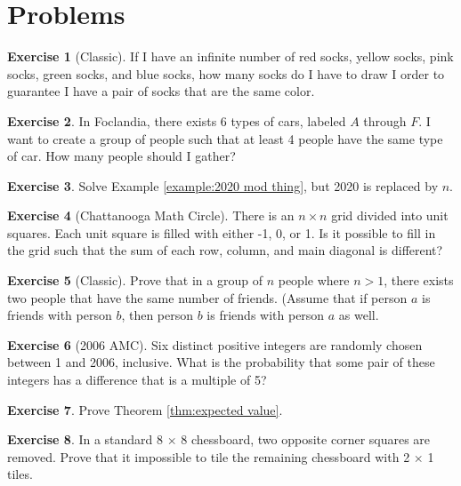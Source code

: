 \documentclass[l1pt]{article}
\theoremstyle{plain}
\theoremstyle{definition}
\newtheorem{exercise}{Exercise}[section]
\theoremstyle{remark}
\begin{document}
\bigskip


\section{Problems}

\begin{exercise}[Classic]
If I have an infinite number of red socks, yellow socks, pink socks, green socks, and blue socks, how many socks do I have to draw I order to guarantee I have a pair of socks that are the same color.
\end{exercise}

\begin{exercise}
In Foclandia, there exists 6 types of cars, labeled $A$ through $F$. I want to create a group of people such that at least 4 people have the same type of car. How many people should I gather?
\end{exercise}

\begin{exercise}
 Solve Example \ref{example:2020 mod thing}, but 2020 is replaced by $n$.
\end{exercise}

\begin{exercise}[Chattanooga Math Circle]
 There is an $n \times n$ grid divided into unit squares. Each unit square is filled with either -1, 0, or 1. Is it possible to fill in the grid such that the sum of each row, column, and main diagonal is different?
\end{exercise}

\begin{exercise}[Classic]
Prove that in a group of $n$ people where $n>1$, there exists two people that have the same number of friends. (Assume that if person $a$ is friends with person $b$, then person $b$ is friends with person $a$ as well. 
\end{exercise}

\begin{exercise}[2006 AMC]
 Six distinct positive integers are randomly chosen between 1 and 2006, inclusive. What is the probability that some pair of these integers has a difference that is a multiple of 5?
\end{exercise}

\begin{exercise}
 Prove Theorem \ref{thm:expected value}.
\end{exercise}

\begin{exercise}
In a standard 8 $\times$ 8 chessboard, two opposite corner squares are removed. Prove that it impossible to tile the remaining chessboard with 2 $\times$ 1 tiles.
\end{exercise}
\end{document}

